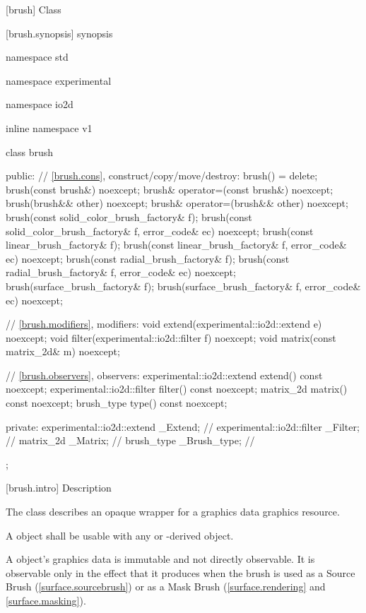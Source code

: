  [brush] {Class }

 [brush.synopsis] { synopsis}

\begin{codeblock}
namespace std { namespace experimental { namespace io2d { inline namespace v1 {
  class brush {
  public:
    // \ref{brush.cons}, construct/copy/move/destroy:
    brush() = delete;
    brush(const brush&) noexcept;
    brush& operator=(const brush&) noexcept;
    brush(brush&& other) noexcept;
    brush& operator=(brush&& other) noexcept;
    brush(const solid_color_brush_factory& f);
    brush(const solid_color_brush_factory& f, error_code& ec) noexcept;
    brush(const linear_brush_factory& f);
    brush(const linear_brush_factory& f, error_code& ec) noexcept;
    brush(const radial_brush_factory& f);
    brush(const radial_brush_factory& f, error_code& ec) noexcept;
    brush(surface_brush_factory& f);
    brush(surface_brush_factory& f, error_code& ec) noexcept;

    // \ref{brush.modifiers}, modifiers:
    void extend(experimental::io2d::extend e) noexcept;
    void filter(experimental::io2d::filter f) noexcept;
    void matrix(const matrix_2d& m) noexcept;

    // \ref{brush.observers}, observers:
    experimental::io2d::extend extend() const noexcept;
    experimental::io2d::filter filter() const noexcept;
    matrix_2d matrix() const noexcept;
    brush_type type() const noexcept;

  private:
    experimental::io2d::extend _Extend; // \expos
    experimental::io2d::filter _Filter; // \expos
    matrix_2d _Matrix;                         // \expos
    brush_type _Brush_type;                    // \expos
  };
} } } }
\end{codeblock}

 [brush.intro] { Description}

\pnum
{}
The class  describes an opaque wrapper for a graphics data graphics resource.

\pnum
A  object shall be usable with any  or -derived object.

\pnum
A  object's graphics data is immutable and not directly observable. It is observable only in the effect that it produces when the brush is used as a Source Brush (\ref{surface.sourcebrush}) or as a Mask Brush (\ref{surface.rendering} and \ref{surface.masking}).

